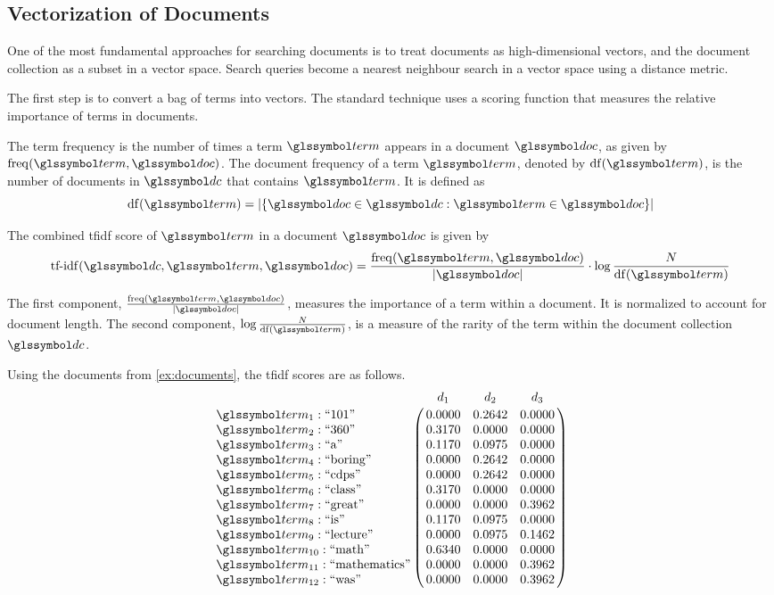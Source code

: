 	\subsection{Vectorization of Documents}
	\label{sec:vectorization-of-documents}
		One of the most fundamental approaches for searching documents is to treat documents as high-dimensional vectors, and the document collection as a subset in a vector space.  Search queries become a nearest neighbour search in a vector space using a distance metric.
		
		The first step is to convert a bag of terms into vectors.  The standard technique \cite{ir-08} uses a scoring function that measures the relative importance of terms in documents.
		
		\begin{defn}
			The term frequency is the number of times a term \(\term\) appears in a document \(\doc\), as given by \(\freq(\term, \doc)\).	The document frequency of a term \(\term\), denoted by \(\df(\term)\), is the number of documents in \(\dc\) that contains \(\term\).	 It is defined as
			\[
				\df(\term) = \abs{\{\doc \in \dc: \term \in \doc\}}
			\]
			
			The combined \gls{tfidf} score of \(\term\) in a document \(\doc\) is given by
			\[
				\tfidf(\dc, \term, \doc) = \frac{\freq(\term, \doc)}{\abs{\doc}} \cdot \log{\frac{N}{\df(\term)}}
			\]
		\end{defn}
		
		The first component, \(\frac{\freq\left(\term, \doc\right)}{\abs{\doc}}\), measures the importance of a term within a document.  It is normalized to account for document length.	 The second component, \(\log{\frac{N}{\df\left(\term\right)}}\), is a measure of the rarity of the term within the document collection \(\dc\).
		
		\begin{ex}
			Using the documents from \vref{ex:documents}, the \gls{tfidf} scores are as follows.
			\[
				\bordermatrix{
					~ & d_1 & d_2 & d_3 \cr
					\term_{1} : \text{``101''} & 0.0000 & 0.2642 & 0.0000 \cr
					\term_{2} : \text{``360''} & 0.3170 & 0.0000 & 0.0000 \cr
					\term_{3} : \text{``a''} & 0.1170 & 0.0975 & 0.0000 \cr
					\term_{4} : \text{``boring''} & 0.0000 & 0.2642 & 0.0000 \cr
					\term_{5} : \text{``cdps''} & 0.0000 & 0.2642 & 0.0000 \cr
					\term_{6} : \text{``class''} & 0.3170 & 0.0000 & 0.0000 \cr
					\term_{7} : \text{``great''} & 0.0000 & 0.0000 & 0.3962 \cr
					\term_{8} : \text{``is''} & 0.1170 & 0.0975 & 0.0000 \cr
					\term_{9} : \text{``lecture''} & 0.0000 & 0.0975 & 0.1462 \cr
					\term_{10} : \text{``math''} & 0.6340 & 0.0000 & 0.0000 \cr
					\term_{11} : \text{``mathematics''} & 0.0000 & 0.0000 & 0.3962 \cr
					\term_{12} : \text{``was''} & 0.0000 & 0.0000 & 0.3962 \cr
				}
			\]
		\end{ex}

